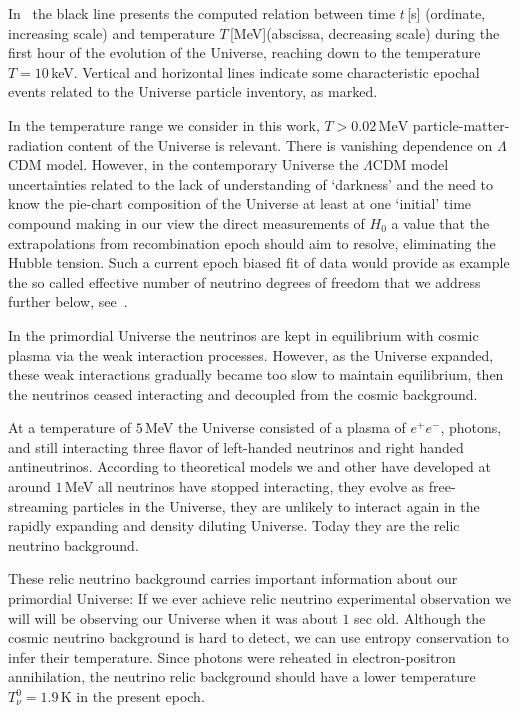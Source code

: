 In~ the black line presents the computed relation between time $t$\,[s] (ordinate, increasing scale) and temperature $T$\,[MeV](abscissa, decreasing scale) during the first hour of the evolution of the Universe, reaching down to the temperature $T=10$\,keV. Vertical and horizontal lines indicate some characteristic epochal events related to the Universe particle inventory, as marked. 

In the temperature range we consider in this work, $T>0.02\,\mathrm{MeV}$  particle-matter-radiation content of the Universe is relevant. There is vanishing dependence on $\Lambda$CDM model. However, in the contemporary Universe the $\Lambda$CDM model uncertainties related to the lack of understanding of `darkness' and the need to know the pie-chart composition of the Universe at least at one `initial' time compound making in our view the direct measurements of $H_0$ a value that the extrapolations from recombination epoch should aim to resolve, eliminating the Hubble tension. Such a current epoch biased fit of data would provide as example the so called effective number of neutrino degrees of freedom that we address further below, see~.


In the primordial Universe the neutrinos are kept in equilibrium with cosmic plasma via the weak interaction processes. However, as the Universe expanded, these weak interactions gradually became too slow to maintain equilibrium, then the neutrinos ceased interacting and decoupled from the cosmic background.

At a temperature of $5$\,MeV the Universe consisted of a plasma of $e^+e^-$, photons, and still interacting three flavor of left-handed neutrinos and right handed antineutrinos. According to theoretical models we and other have developed at around $1$\,MeV all neutrinos have stopped interacting, they evolve as free-streaming particles in the Universe,  they are unlikely to interact again in the rapidly expanding and density diluting Universe.  Today they are the relic neutrino background.

These relic neutrino background carries important  information about our primordial Universe: If we ever achieve relic neutrino experimental observation we will will be observing our Universe when it was about $1$ sec old. Although the cosmic neutrino background is hard to detect, we can use entropy conservation to infer their temperature. Since photons were reheated in electron-positron annihilation, the neutrino relic background  should have a lower  temperature $T_\nu^0=1.9\,\mathrm{K}$ in the present epoch.

